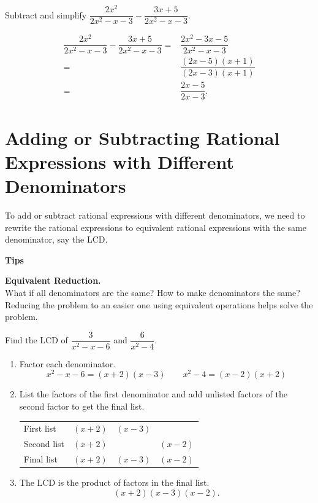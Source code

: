 \documentclass[en,12pt]{elegantbook}
\newenvironment{rmdtip}{
	\par\noindent
	{
		\makebox[-\width][r]{
			\footnotesize\color{red!90}
            \HandRight
			\hspace*{1pt}
		}
			\textbf{
				\color{second}
				\hspace*{3pt}
				Tips 
			}
    }
    \begin{shaded}
    \sffamily
}{
    \par\medskip\ignorespacesafterend
    \end{shaded}
}
\let\BeginKnitrBlock\begin \let\EndKnitrBlock\end
\begin{document}
\BeginKnitrBlock{example}
\protect\hypertarget{exm:unnamed-chunk-44}{}{\label{exm:unnamed-chunk-44} }
Subtract and simplify \(\dfrac{2x^2}{2x^2-x-3}-\dfrac{3x+5}{2x^2-x-3}\).
\EndKnitrBlock{example}

\BeginKnitrBlock{solution}


\[
\begin{aligned}
    \dfrac{2x^2}{2x^2-x-3}-\dfrac{3x+5}{2x^2-x-3}=&\dfrac{2x^2-3x-5}{2x^2-x-3}\\
    =&\dfrac{(2x-5)(x+1)}{(2x-3)(x+1)}\\
    =&\dfrac{2x-5}{2x-3}.
\end{aligned}
\]
\EndKnitrBlock{solution}

\hypertarget{adding-or-subtracting-rational-expressions-with-different-denominators}{%
\section{Adding or Subtracting Rational Expressions with Different Denominators}\label{adding-or-subtracting-rational-expressions-with-different-denominators}}

To add or subtract rational expressions with different denominators, we need to rewrite the rational expressions to equivalent rational expressions with the same denominator, say the LCD.

\begin{rmdtip}

\textbf{Equivalent Reduction.}\\
What if all denominators are the same? How to make denominators the same? Reducing the problem to an easier one using equivalent operations helps solve the problem.

\end{rmdtip}

\BeginKnitrBlock{example}
\protect\hypertarget{exm:unnamed-chunk-46}{}{\label{exm:unnamed-chunk-46} }
Find the LCD of \(\dfrac{3}{x^2-x-6}\) and \(\dfrac{6}{x^2-4}\).
\EndKnitrBlock{example}

\BeginKnitrBlock{solution}


\begin{enumerate}
\def\labelenumi{\arabic{enumi}.}
\item
  Factor each denominator.
  \[
   x^2-x-6=(x+2)(x-3)\qquad x^2-4=(x-2)(x+2)
  \]
\item
  List the factors of the first denominator and add unlisted factors of the second factor to get the final list.

  \begin{longtable}[]{@{}lccc@{}}
  \toprule
  \endhead
  First list & \((x+2)\) & \((x-3)\) &\tabularnewline
  Second list & \((x+2)\) & & \((x-2)\)\tabularnewline
  Final list & \((x+2)\) & \((x-3)\) & \((x-2)\)\tabularnewline
  \bottomrule
  \end{longtable}
\item
  The LCD is the product of factors in the final list.\\
  \[(x+2)(x-3)(x-2).\]
\end{enumerate}
\EndKnitrBlock{solution}
\end{document}
